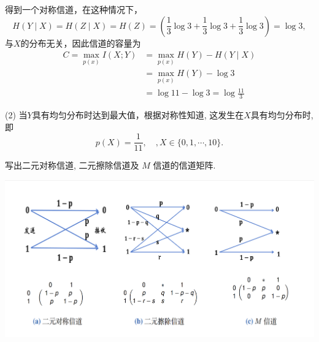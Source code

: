 \begin{tcolorbox}[breakable,colback=blue!5!white,colframe=blue!75!black,
 title= 解答题]
得到一个对称信道，在这种情况下，
$$
H(Y \mid X)=H(Z \mid X)=H(Z)=\left(\frac{1}{3} \log 3+\frac{1}{3} \log 3+\frac{1}{3} \log 3\right) =\log 3,
$$
与$ X $的分布无关，因此信道的容量为
$$
\begin{aligned}
C  =\max _{p(x)} I(X ; Y) & =\max _{p(x)} H(Y)-H(Y \mid X) \\
& =\max _{p(x)} H(Y)-\log 3 \\
& =\log 11-\log 3= \log \frac{11}{3}
\end{aligned}
$$

(2) 当$ Y $具有均匀分布时达到最大值，根据对称性知道, 这发生在$ X $具有均匀分布时,即
$$
p(X)=\frac{1}{11}, \quad, X \in\{0,1, \cdots, 10\} .
$$



\end{tcolorbox}




\begin{tcolorbox}[breakable,colback=blue!5!white,colframe=blue!75!black,
 title= 解答题]

写出二元对称信道, 二元擦除信道及 $ M $ 信道的信道矩阵.
\tcblower

    \centering
    \includegraphics[width=1\linewidth]{3.png}
    
\end{tcolorbox}



